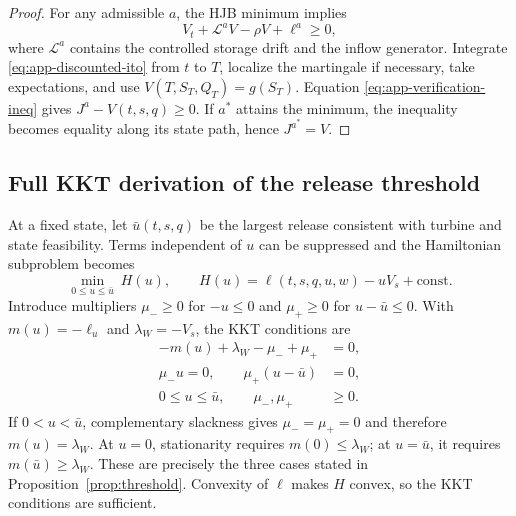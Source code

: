 \documentclass[11pt,a4paper]{article}
\begin{document}
\begin{proof}
For any admissible $a$, the HJB minimum implies
\begin{equation}
 V_t+\mathcal L^aV-\rho V+\ell^a\ge0,
 \label{eq:app-verification-ineq}
\end{equation}
where $\mathcal L^a$ contains the controlled storage drift and the inflow generator.
Integrate \eqref{eq:app-discounted-ito} from $t$ to $T$, localize the martingale if
necessary, take expectations, and use $V(T,S_T,Q_T)=g(S_T)$. Equation
\eqref{eq:app-verification-ineq} gives $J^a-V(t,s,q)\ge0$. If $a^*$ attains the
minimum, the inequality becomes equality along its state path, hence
$J^{a^*}=V$.
\end{proof}

\subsection{Full KKT derivation of the release threshold}
At a fixed state, let $\bar u(t,s,q)$ be the largest release consistent with turbine
and state feasibility. Terms independent of $u$ can be suppressed and the Hamiltonian
subproblem becomes
\begin{equation}
 \min_{0\le u\le\bar u}\ H(u),\qquad
 H(u)=\ell(t,s,q,u,w)-uV_s+\text{const}.
 \label{eq:app-hamiltonian-u}
\end{equation}
Introduce multipliers $\mu_-\ge0$ for $-u\le0$ and $\mu_+\ge0$ for
$u-\bar u\le0$. With $m(u)=-\ell_u$ and $\lambda_W=-V_s$, the KKT conditions are
\begin{align}
 -m(u)+\lambda_W-\mu_-+\mu_+&=0,
 \label{eq:app-kkt-stationarity}\\
 \mu_-u=0,\qquad \mu_+(u-\bar u)&=0,
 \label{eq:app-kkt-comp}\\
 0\le u\le\bar u,\qquad \mu_-,\mu_+&\ge0.
 \label{eq:app-kkt-feas}
\end{align}
If $0<u<\bar u$, complementary slackness gives $\mu_-=\mu_+=0$ and therefore
$m(u)=\lambda_W$. At $u=0$, stationarity requires $m(0)\le\lambda_W$; at
$u=\bar u$, it requires $m(\bar u)\ge\lambda_W$. These are precisely the three
cases stated in Proposition~\ref{prop:threshold}. Convexity of $\ell$ makes $H$
convex, so the KKT conditions are sufficient.
\end{document}
